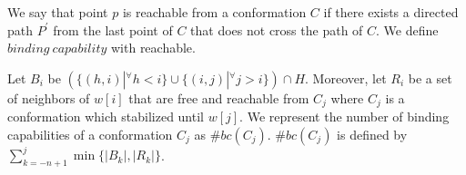 \documentclass[runningheads]{llncs}
\begin{document}

We say that point $p$ is reachable from a conformation $C$ if there exists a directed path $P^\prime$ from the last point of $C$ that does not cross the path of $C$. We define $binding\ capability$ with reachable.

\begin{definition}
Let $B_i$ be $( \{ (h, i) | {}^\forall h < i \} \cup \{ (i, j) | {}^\forall j > i \}) \cap H$. Moreover, let $R_i$ be a set of neighbors of $w[i]$ that are free and reachable from $C_j$ where $C_j$ is a conformation which stabilized until $w[j]$.
 We represent the number of binding capabilities of a conformation $C_j$ as $\#bc(C_j)$. $\#bc(C_j)$ is defined by $\sum^{j}_{k=-n+1} \min \{ |B_k|, |R_k|  \}$.
\end{definition}
\end{document}
